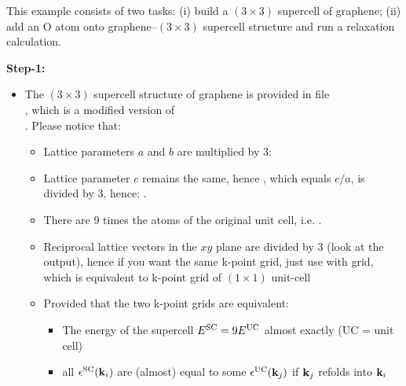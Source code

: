 \documentclass[landscape]{foils}
\begin{document}
This example consists of two tasks: (i) build a $(3\times3)$ supercell
of graphene; (ii) add an O atom onto graphene--$(3\times3)$ supercell
structure and run a relaxation calculation.
    
{\bf Step-1:}
\vspace{-1em}
\begin{itemize}
\item The $(3\times3)$ supercell structure of
  graphene is provided in file\\
  , which is a modified version of\\
  . Please
  notice that:
  \begin{itemize}
  \item Lattice parameters $a$ and $b$ are multiplied by 3:
    \vspace{0.3em}
  \item Lattice parameter $c$ remains the same, hence ,
    which equals $c/a$, is divided by 3, hence: .
    \vspace{0.3em}
  \item There are 9 times the atoms of the original unit cell, i.e. .
    \vspace{0.3em}
  \item Reciprocal lattice vectors in the $xy$ plane are divided by 3
    (look at the output), hence if you want the same k-point grid,
    just use  with 
    grid, which is equivalent to  k-point grid of
    $(1\times1)$ unit-cell \vspace{0.3em}
  \item Provided that {\red the two k-point grids are equivalent}:
    \begin{itemize}
    \item
      The energy of the supercell $E^{\rm SC} = 9E^{\rm UC}$ almost exactly
      (UC = unit cell)
    \item
      all $\epsilon^{\rm SC}({\bf k}_i)$ are (almost) equal to some
      $\epsilon^{\rm UC}({\bf k}_j)$ if ${\bf k}_j$ refolds into ${\bf k}_i$
    \end{itemize}   
  \end{itemize}
\end{itemize}
\end{document}

